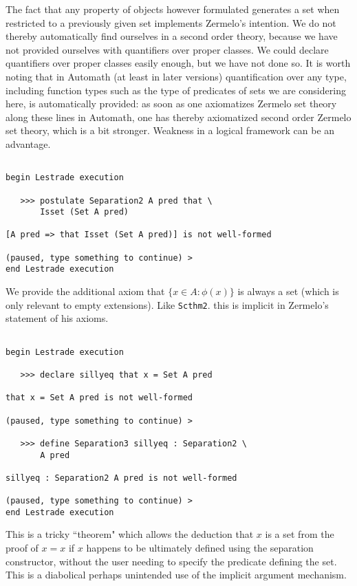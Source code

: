 \documentclass[12pt]{article}
\begin{document}
The fact that any property of objects however formulated generates a set when restricted to a previously given set implements Zermelo's intention.  We do not thereby automatically find ourselves in a second order theory, because we have not provided ourselves with quantifiers over proper classes.  We could declare quantifiers over proper classes easily enough, but we have not done so.  It is worth noting that in Automath (at least in later versions) quantification over any type, including function types such as the type of predicates of sets we are considering here, is automatically provided:  as soon as one axiomatizes Zermelo set theory along these lines in Automath, one has thereby axiomatized second order Zermelo set theory, which is a bit stronger.  Weakness in a logical framework can be an advantage.

\begin{verbatim}

begin Lestrade execution

   >>> postulate Separation2 A pred that \
       Isset (Set A pred)

[A pred => that Isset (Set A pred)] is not well-formed

(paused, type something to continue) >
end Lestrade execution
\end{verbatim}

We provide the additional axiom that $\{x \in A:\phi(x)\}$ is always a set (which is only relevant to empty extensions).  Like {\tt Scthm2}. this is implicit in Zermelo's statement of his axioms.

\begin{verbatim}

begin Lestrade execution

   >>> declare sillyeq that x = Set A pred

that x = Set A pred is not well-formed

(paused, type something to continue) >

   >>> define Separation3 sillyeq : Separation2 \
       A pred

sillyeq : Separation2 A pred is not well-formed

(paused, type something to continue) >
end Lestrade execution
\end{verbatim}

This is a tricky ``theorem" which allows the deduction that $x$ is a set from the proof of $x=x$ if $x$ happens to be ultimately defined using the separation constructor, without the user needing to specify the predicate defining the set.  This is a diabolical perhaps unintended use of the implicit argument mechanism.
\end{document}
